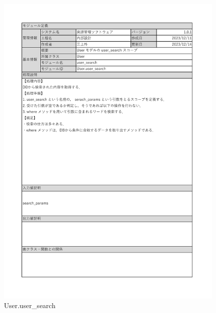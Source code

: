 \begin{figure}
    \centering
    \includegraphics[scale=0.5]{img/Method/User_search(scope).pdf}
    \caption{User.user\_search}
\end{figure}
\clearpage

